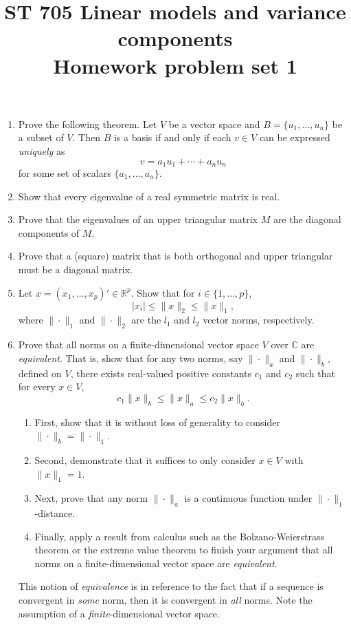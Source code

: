 \documentclass[11pt]{article}
\title{ST 705 Linear models and variance components \\ 
        Homework problem set 1}
\begin{document}
\maketitle

\begin{enumerate}

\item Prove the following theorem.  Let $V$ be a vector space and $B = \{u_{1},\dots,u_{n}\}$ be a subset of $V$.  Then $B$ is a basis if and only if each $v \in V$ can be expressed \textit{uniquely} as 
\[
v = a_{1}u_{1} + \cdots + a_{n}u_{n}
\] 
for some set of scalars $\{a_{1},\dots,a_{n}\}$.

\item Show that every eigenvalue of a real symmetric matrix is real.

\item Prove that the eigenvalues of an upper triangular matrix $M$ are the diagonal components of $M$.

\item Prove that a (square) matrix that is both orthogonal and upper triangular must be a diagonal matrix.

\item Let $x = (x_{1}, \dots, x_{p})' \in \mathbb{R}^{p}$.  Show that for $i \in \{1,\dots,p\}$,
\[
|x_{i}| \le \|x\|_{2} \le \|x\|_{1},
\]
where $\|\cdot\|_{1}$ and $\|\cdot\|_{2}$ are the $l_{1}$ and $l_{2}$ vector norms, respectively.

\item Prove that all norms on a finite-dimensional vector space $V$ over $\mathbb{C}$ are {\em equivalent}.  That is, show that for any two norms, say $\|\cdot\|_{a}$ and $\|\cdot\|_{b}$, defined on $V$, there exists real-valued positive constants $c_{1}$ and $c_{2}$ such that for every $x \in V$,
\[
c_{1}\|x\|_{b} \le \|x\|_{a} \le c_{2}\|x\|_{b}.
\]
\begin{enumerate}
\item First, show that it is without loss of generality to consider $\|\cdot\|_{b} = \|\cdot\|_{1}$.
\item Second, demonstrate that it suffices to only consider $x \in V$ with $\|x\|_{1} = 1$.
\item Next, prove that any norm $\|\cdot\|_{a}$ is a continuous function under $\|\cdot\|_{1}$-distance.
\item Finally, apply a result from calculus such as the Bolzano-Weierstrass theorem or the extreme value theorem to finish your argument that all norms on a finite-dimensional vector space are {\em equivalent}.
\end{enumerate}
This notion of {\em equivalence} is in reference to the fact that if a sequence is convergent in {\em some} norm, then it is convergent in {\em all} norms.  Note the assumption of a {\em finite}-dimensional vector space.

\end{enumerate}
\end{document}

